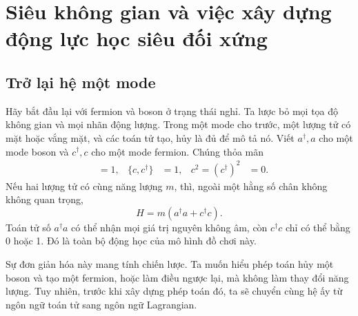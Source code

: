 \chapter{Siêu không gian và việc xây dựng động lực học siêu đối xứng}


\section{Trở lại hệ một mode}

Hãy bắt đầu lại với fermion và boson ở trạng thái nghỉ. Ta lược bỏ mọi tọa độ không gian và mọi nhãn động lượng. Trong một mode cho trước, một lượng tử có mặt hoặc vắng mặt, và các toán tử tạo, hủy là đủ để mô tả nó. Viết \(a^\dagger,a\) cho một mode boson và \(c^\dagger,c\) cho một mode fermion. Chúng thỏa mãn
\begin{align}
[a,a^\dagger]&=1,
&
\{c,c^\dagger\}&=1,
&
c^2=(c^\dagger)^2&=0.
\end{align}
Nếu hai lượng tử có cùng năng lượng \(m\), thì, ngoài một hằng số chân không không quan trọng,
\begin{equation}
H=m\left(a^\dagger a+c^\dagger c\right).
\label{eq:l7-one-mode-hamiltonian}
\end{equation}
Toán tử số \(a^\dagger a\) có thể nhận mọi giá trị nguyên không âm, còn \(c^\dagger c\) chỉ có thể bằng 0 hoặc 1. Đó là toàn bộ động học của mô hình đồ chơi này.

Sự đơn giản hóa này mang tính chiến lược. Ta muốn hiểu phép toán hủy một boson và tạo một fermion, hoặc làm điều ngược lại, mà không làm thay đổi năng lượng. Tuy nhiên, trước khi xây dựng phép toán đó, ta sẽ chuyển cùng hệ ấy từ ngôn ngữ toán tử sang ngôn ngữ Lagrangian.

